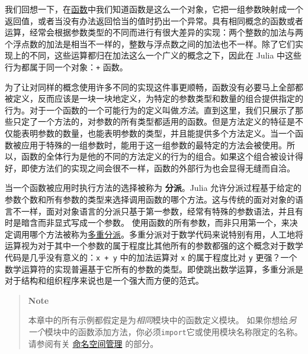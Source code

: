 我们回想一下，在\hyperlink{645008301484218813}{函数}中我们知道函数是这么一个对象，它把一组参数映射成一个返回值，或者当没有办法返回恰当的值时扔出一个异常。具有相同概念的函数或者运算，经常会根据参数类型的不同而进行有很大差异的实现：两个整数的加法与两个浮点数的加法是相当不一样的，整数与浮点数之间的加法也不一样。除了它们实现上的不同，这些运算都归在{\textquotedbl}加法{\textquotedbl}这么一个广义的概念之下，因此在 Julia 中这些行为都属于同一个对象：\texttt{+} 函数。



为了让对同样的概念使用许多不同的实现这件事更顺畅，函数没有必要马上全部都被定义，反而应该是一块一块地定义，为特定的参数类型和数量的组合提供指定的行为。对于一个函数的一个可能行为的定义叫做\emph{方法}。直到这里，我们只展示了那些只定了一个方法的，对参数的所有类型都适用的函数。但是方法定义的特征是不仅能表明参数的数量，也能表明参数的类型，并且能提供多个方法定义。当一个函数被应用于特殊的一组参数时，能用于这一组参数的最特定的方法会被使用。所以，函数的全体行为是他的不同的方法定义的行为的组合。如果这个组合被设计得好，即使方法们的实现之间会很不一样，函数的外部行为也会显得无缝而自洽。



当一个函数被应用时执行方法的选择被称为 \textbf{分派}。Julia 允许分派过程基于给定的参数个数和所有参数的类型来选择调用函数的哪个方法。这与传统的面对对象的语言不一样，面对对象语言的分派只基于第一参数，经常有特殊的参数语法，并且有时是暗含而非显式写成一个参数。 \footnotemark[1] 使用函数的所有参数，而非只用第一个，来决定调用哪个方法被称为\href{https://en.wikipedia.org/wiki/Multiple\_dispatch}{多重分派}。多重分派对于数学代码来说特别有用，人工地将运算视为对于其中一个参数的属于程度比其他所有的参数都强的这个概念对于数学代码是几乎没有意义的：\texttt{x + y} 中的加法运算对 \texttt{x} 的属于程度比对 \texttt{y} 更强？一个数学运算符的实现普遍基于它所有的参数的类型。即使跳出数学运算，多重分派是对于结构和组织程序来说也是一个强大而方便的范式。





\begin{quote}
\textbf{Note}

本章中的所有示例都假定是为\emph{相同}模块中的函数定义模块。 如果你想给\emph{另一个}模块中的函数添加方法，你必须\texttt{import}它或使用模块名称限定的名称。 请参阅有关 \hyperlink{15504003297523876122}{命名空间管理} 的部分。

\end{quote}


